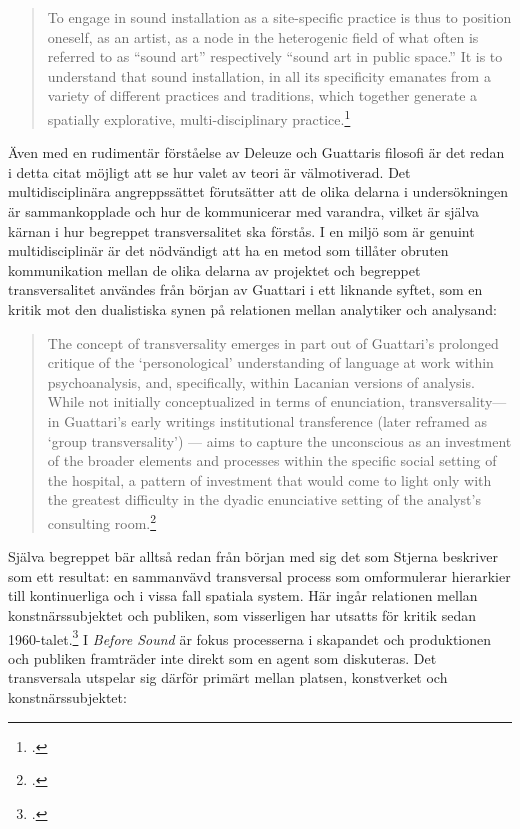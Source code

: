 \documentclass[11pt]{article}
\begin{document}
\begin{quote}
    To engage in sound installation as a site-specific practice is
    thus to position oneself, as an artist, as a node in the
    heterogenic field of what often is referred to as “sound art”
    respectively “sound art in public space.” It is to understand that
    sound installation, in all its specificity emanates from a variety
    of different practices and traditions, which together generate a
    spatially explorative, multi-disciplinary
    practice.\footcite[sid. 42]{Stjerna2018}
\end{quote}

Även med en rudimentär förståelse av Deleuze och Guattaris filosofi är
det redan i detta citat möjligt att se hur valet av teori är
välmotiverad. Det multidisciplinära angreppssättet förutsätter att de
olika delarna i undersökningen är sammankopplade och hur de
kommunicerar med varandra, vilket är själva kärnan i hur begreppet
transversalitet ska förstås. I en miljö som är genuint
multidisciplinär är det nödvändigt att ha en metod som tillåter
obruten kommunikation mellan de olika delarna av projektet och
begreppet transversalitet användes från början av Guattari i ett
liknande syftet, som en kritik mot den dualistiska synen på relationen
mellan analytiker och analysand:

\begin{quote}
    The concept of transversality emerges in part out of Guattari’s
    prolonged critique of the ‘personological’ understanding of
    language at work within psychoanalysis, and, specifically, within
    Lacanian versions of analysis. While not initially conceptualized
    in terms of enunciation, transversality—in Guattari’s early
    writings institutional transference (later reframed as ‘group
    transversality’) — aims to capture the unconscious as an
    investment of the broader elements and processes within the
    specific social setting of the hospital, a pattern of investment
    that would come to light only with the greatest difficulty in the
    dyadic enunciative setting of the analyst’s consulting
    room.\footcite[sid. 234]{Goffey2015}
\end{quote}

Själva begreppet bär alltså redan från början med sig det som Stjerna
beskriver som ett resultat: en sammanvävd transversal process som
omformulerar hierarkier till kontinuerliga och i vissa fall spatiala
system. Här ingår relationen mellan konstnärssubjektet och publiken,
som visserligen har utsatts för kritik sedan
1960-talet.\footcite[sid. 48]{Stjerna2018} I \emph{Before Sound} är fokus
processerna i skapandet och produktionen och publiken framträder inte
direkt som en agent som diskuteras. Det transversala utspelar sig
därför primärt mellan platsen, konstverket och konstnärssubjektet:
\end{document}
